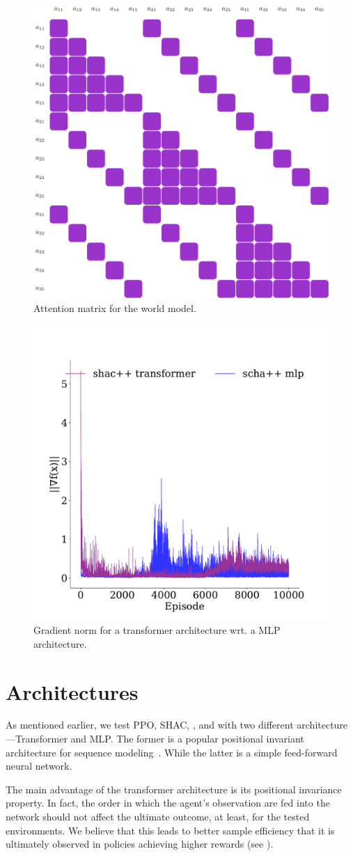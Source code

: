 

\begin{figure}[t]
    \centering
    \includegraphics[width=.45\textwidth]{figs/attention.pdf} 
    \caption{Attention matrix for the world model.}
    \label{fig:apx:attention}
\end{figure}

\begin{figure}[t]
    \centering
    \includegraphics[width=.45\textwidth]{figs/grads-mlp-transport.pdf}
    \caption{Gradient norm for a transformer architecture wrt. a MLP architecture.}
    \label{fig:grads-mlp}
\end{figure}


\section{Architectures}\label{apx:arch}

As mentioned earlier, we test PPO, SHAC, \fname{}, and \fnamer{} with two different architecture---Transformer and MLP. The former is a popular positional invariant architecture for sequence modeling~\cite{Vaswani17}. While the latter is a simple feed-forward neural network.

The main advantage of the transformer architecture is its positional invariance property. In fact, the order in which the agent's observation are fed into the network should not affect the ultimate outcome, at least, for the tested environments. We believe that this leads to better sample efficiency that it is ultimately observed in policies achieving higher rewards (see ). 

